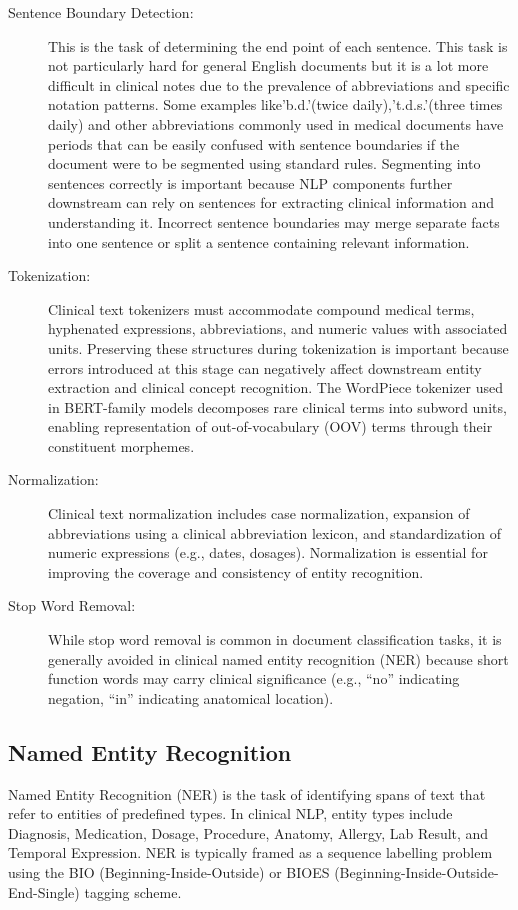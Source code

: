 \begin{description}
    \item[Sentence Boundary Detection:] This is the task of determining the end point of each sentence. This task is not particularly hard for general English documents but it is a lot more difficult in clinical notes due to the prevalence of abbreviations and specific notation patterns. Some examples like'b.d.'(twice daily),'t.d.s.'(three times daily) and other abbreviations commonly used in medical documents have periods that can be easily confused with sentence boundaries if the document were to be segmented using standard rules. Segmenting into sentences correctly is important because NLP components further downstream can rely on sentences for extracting clinical information and understanding it. Incorrect sentence boundaries may merge separate facts into one sentence or split a sentence containing relevant information.
    \item[Tokenization:] Clinical text tokenizers must accommodate compound medical terms, hyphenated expressions, abbreviations, and numeric values with associated units. Preserving these structures during tokenization is important because errors introduced at this stage can negatively affect downstream entity extraction and clinical concept recognition. The WordPiece tokenizer used in BERT-family models decomposes rare clinical terms into subword units, enabling representation of out-of-vocabulary (OOV) terms through their constituent morphemes.
    \item[Normalization:] Clinical text normalization includes case normalization, expansion of abbreviations using a clinical abbreviation lexicon, and standardization of numeric expressions (e.g., dates, dosages). Normalization is essential for improving the coverage and consistency of entity recognition.
    \item[Stop Word Removal:] While stop word removal is common in document classification tasks, it is generally avoided in clinical named entity recognition (NER) because short function words may carry clinical significance (e.g., ``no'' indicating negation, ``in'' indicating anatomical location).
\end{description}

\subsection{Named Entity Recognition}
Named Entity Recognition (NER) is the task of identifying spans of text that refer to entities of predefined types. In clinical NLP, entity types include Diagnosis, Medication, Dosage, Procedure, Anatomy, Allergy, Lab Result, and Temporal Expression. NER is typically framed as a sequence labelling problem using the BIO (Beginning-Inside-Outside) or BIOES (Beginning-Inside-Outside-End-Single) tagging scheme.

